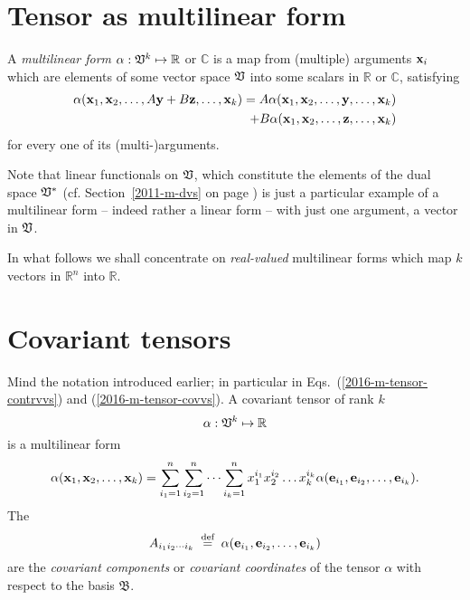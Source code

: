 \section{Tensor as multilinear form}

A {\em multilinear form}
$\alpha :{ \frak V }^k \mapsto \mathbb{R}$  or  $\mathbb{C}$
is a map from (multiple) arguments ${\bf x}_i$ which are elements of some vector space  $\frak V$
into some scalars in $\mathbb{R}$ or $\mathbb{C}$,  satisfying
\begin{equation}
\begin{split}
\alpha ( {\bf x}_1,{\bf x}_2,\ldots , A {\bf y}+ B {\bf z}, \ldots ,{\bf x}_k)
=
A\alpha ( {\bf x}_1,{\bf x}_2,\ldots , {\bf y}, \ldots ,{\bf x}_k)   \\
   \qquad +
B\alpha ( {\bf x}_1,{\bf x}_2,\ldots , {\bf z}, \ldots ,{\bf x}_k)
\end{split}
\end{equation}
for every one of its (multi-)arguments.

{
\color{blue}
Note that linear functionals on ${\frak V}$, which constitute the elements of the dual space ${\frak V}^\ast$
(cf. Section~\ref{2011-m-dvs} on page \pageref{2011-m-dvs}) is just a particular example of a  multilinear form
-- indeed rather a  linear form -- with just one argument, a vector in ${\frak V}$.
\eexample
}

In what follows we shall concentrate on {\em real-valued} multilinear forms which map
$k$ vectors in
$\mathbb{R}^n$
into
$\mathbb{R}$.



\section{Covariant tensors}


Mind the notation introduced earlier; in particular in Eqs.~(\ref{2016-m-tensor-contrvvs}) and (\ref{2016-m-tensor-covvs}).
A covariant tensor of rank $k$
\begin{equation}
\alpha:{ \frak V }^k \mapsto \mathbb{R}
\end{equation}
is a multilinear form
\begin{equation}
\alpha ( {\bf x}_1,{\bf x}_2,\ldots ,{\bf x}_k)=
\sum_{i_1=1}^n
\sum_{i_2=1}^n
\cdots
\sum_{i_k=1}^n
x^{i_1}_1 x^{i_2}_2\ldots x^{i_k}_k
\alpha ( {\bf e}_{i_1},{\bf e}_{i_2},\ldots ,{\bf e}_{i_k}).
\end{equation}
The
\begin{equation}
A_{{i_1}{i_2}\cdots {i_k}}
\stackrel{{\tiny \textrm{ def }}}{=}
\alpha ( {\bf e}_{i_1},{\bf e}_{i_2},\ldots ,{\bf e}_{i_k})
\end{equation}
 are the
{\em covariant components} or
{\em covariant coordinates}
of the tensor $\alpha $ with respect to the basis
${\mathfrak B}$.

